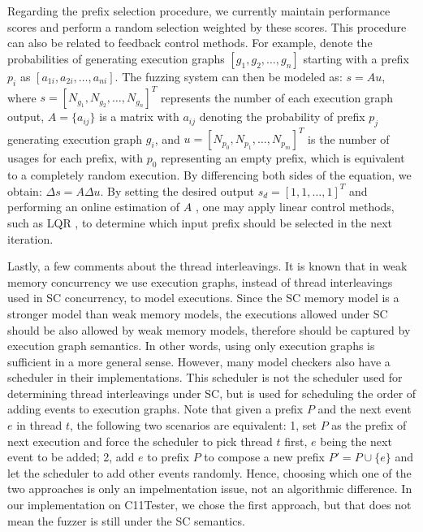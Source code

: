 Regarding the prefix selection procedure, we currently maintain performance scores and perform a random selection weighted by these scores. This procedure can also be related to feedback control methods. For example, denote the probabilities of generating execution graphs \([g_1, g_2, \ldots, g_n]\) starting with a prefix \(p_i\) as \([a_{1i}, a_{2i}, \ldots, a_{ni}]\). The fuzzing system can then be modeled as: $ s = Au$, where \(s = [N_{g_1}, N_{g_2}, \ldots, N_{g_n}]^T\) represents the number of each execution graph output, \(A = \{ a_{ij} \}\) is a matrix with \(a_{ij}\) denoting the probability of prefix \(p_j\) generating execution graph \(g_i\), and \(u = [N_{p_0}, N_{p_1}, \ldots, N_{p_m}]^T\) is the number of usages for each prefix, with \(p_0\) representing an empty prefix, which is equivalent to a completely random execution. By differencing both sides of the equation, we obtain: $\Delta s = A \Delta u$. By setting the desired output \(s_d = [1, 1, \ldots, 1]^T\) and performing an online estimation of \(A\) \cite{goodwinadaptive}, one may apply linear control methods, such as LQR \cite{lewis2012optimal}, to determine which input prefix should be selected in the next iteration.



Lastly, a few comments about the thread interleavings. It is known that in weak memory concurrency we use execution graphs, instead of thread interleavings used in SC concurrency, to model executions. Since the SC memory model is a stronger model than weak memory models, the executions allowed under SC should be also allowed by weak memory models, therefore should be captured by execution graph semantics. In other words, using only execution graphs is sufficient in a more general sense. However, many model checkers also have a scheduler in their implementations. This scheduler is not the scheduler used for determining thread interleavings under SC, but is used for scheduling the order of adding events to execution graphs. Note that given a prefix $P$ and the next event $e$ in thread $t$, the following two scenarios are equivalent: 1, set $P$ as the prefix of next execution and force the scheduler to pick thread $t$ first, $e$ being the next event to be added; 2, add $e$ to prefix $P$ to compose a new prefix $P' = P \cup \{e\}$ and let the scheduler to add other events randomly. Hence, choosing which one of the two approaches is only an impelmentation issue, not an algorithmic difference. In our implementation on C11Tester, we chose the first approach, but that does not mean the fuzzer is still under the SC semantics.


